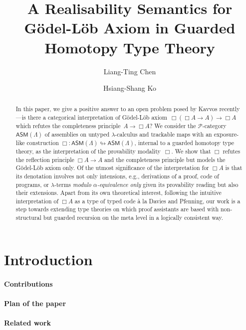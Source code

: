 \documentclass[a4paper,UKenglish,numberwithinsect,cleveref,thm-restate]{lipics-v2021}
\title{A Realisability Semantics for Gödel-Löb Axiom in Guarded Homotopy Type Theory}
\author{Liang-Ting Chen}%
  {Institute of Information Science, Academia Sinica, Taiwan~\url{https://l-tchen.github.io}}%
  {liang.ting.chen.tw@gmail.com}%
  {https://orcid.org/0000-0002-3250-1331}{}
\author{Hsiang-Shang Ko}%
  {Institute of Information Science, Academia Sinica, Taiwan~\url{https://josh-hs-ko.github.io}}%
  {joshko@iis.sinica.edu.tw}%
  {https://orcid.org/0000-0002-2439-1048}{}
\newcommand{\PP}{\mathscr{P}}
\newcommand{\ASM}{\mathsf{ASM}}
\theoremstyle{plain}
\begin{document}
\maketitle

\begin{abstract}
  In this paper, we give a positive answer to an open problem posed by Kavvos recently---is there a categorical interpretation of Gödel-Löb axiom~$\Box (\Box A \to A) \to \Box A$ which refutes the completeness principle~$A \to \Box A$?
  We consider the $\PP$-category $\ASM(\Lambda)$ of assemblies on untyped $\lambda$-calculus and trackable maps with an exposure-like construction $\Box\colon \ASM(\Lambda) \looparrowright \ASM(\Lambda)$, internal to a guarded homotopy type theory, as the interpretation of the provability modality~$\Box$.
  We show that $\Box$ refutes the reflection principle $\Box A \to A$ and the completeness principle but models the Gödel-Löb axiom only.
  Of the utmost significance of the interpretation for $\Box A$ is that its denotation involves not only intensions, e.g., derivations of a proof, code of programs, or $\lambda$-terms \emph{modulo $\alpha$-equivalence only} given its provability reading but also their extensions. 
  Apart from its own theoretical interest, following the intuitive interpretation of $\Box A$ as a type of typed code \`a la Davies and Pfenning, our work is a step towards extending type theories on which proof assistants are based with non-structural but guarded recursion on the meta level in a logically consistent way.
\end{abstract}

\section{Introduction}\label{sec:intro}
\cite{Litak2014}

\paragraph*{Contributions}

\paragraph*{Plan of the paper}

\paragraph*{Related work}
\cite{Visser2019,Beklemishev2006}
\cite{Kavvos2017,Kavvos2020}
\cite{Shamkanov2014,Shamkanov2016a}
\end{document}
